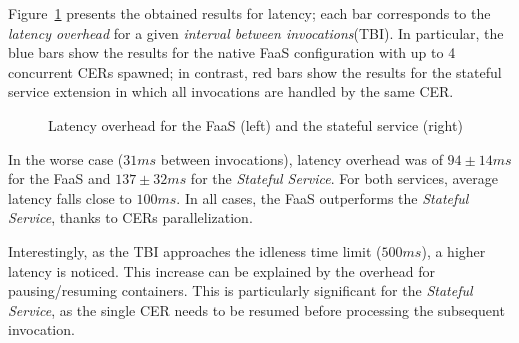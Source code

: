 Figure~\ref{fig:RESULTS_LATENCY} presents the obtained results for latency; each bar corresponds to the \textit{latency overhead} for a given \textit{interval between invocations}(TBI). In particular, the blue bars show the results for the native FaaS configuration with up to 4 concurrent CERs spawned; in contrast, red bars show the results for the stateful service extension in which all invocations are handled by the same CER.

\begin{figure}[btp]
\centering
{}
\caption{Latency overhead for the FaaS (left) and the stateful service (right)}
\label{fig:RESULTS_LATENCY}
\end{figure}

In the worse case ($31ms$ between invocations), latency overhead was of $94\pm14ms$ for the FaaS and $137\pm32ms$ for the \textit{Stateful Service}. For both services, average latency falls close to $100ms$. In all cases, the FaaS outperforms the \textit{Stateful Service}, thanks to CERs parallelization.

Interestingly, as the TBI approaches the idleness time limit ($500ms$), a higher latency is noticed. This increase can be explained by the overhead for pausing/resuming containers. This is particularly significant for the \textit{Stateful Service}, as the single CER needs to be resumed before processing the subsequent invocation. 

